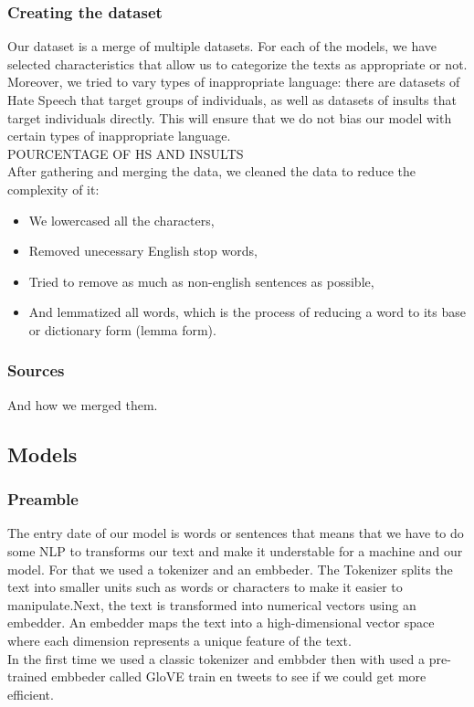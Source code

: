 \documentclass[11pt,a4paper]{article}
\begin{document}
\subsubsection{Creating the dataset}
Our dataset is a merge of multiple datasets. For each of the models, we have selected characteristics that allow us to categorize the texts as appropriate or not. Moreover, we tried to vary types of inappropriate language: there are datasets of Hate Speech that target groups of individuals, as well as datasets of insults that target individuals directly. This will ensure that we do not bias our model with certain types of inappropriate language.\\
POURCENTAGE OF HS AND INSULTS\\
After gathering and merging the data, we cleaned the data to reduce the complexity of it:
\begin{itemize}
    \item We lowercased all the characters,
    \item Removed unecessary English stop words,
    \item Tried to remove as much as non-english sentences as possible,
    \item And lemmatized all words, which is the process of reducing a word to its base or dictionary form (lemma form).
\end{itemize}

\subsubsection{Sources}

And how we merged them.

\subsection{Models}

\subsubsection{Preamble}
The entry date of our model  is  words or sentences that means that we have to do some NLP to transforms our text and make it understable for a machine and our model. For that we used a tokenizer and an embbeder. The Tokenizer splits the text into smaller units such as words or characters to make it easier to manipulate.Next, the text is transformed into numerical vectors using an embedder. An embedder maps the text into a high-dimensional vector space where each dimension represents a unique feature of the text.\\
In the first time we used a classic tokenizer and embbder then with used a pre-trained embbeder called GloVE train en tweets to see if we could get more efficient.
\end{document}
